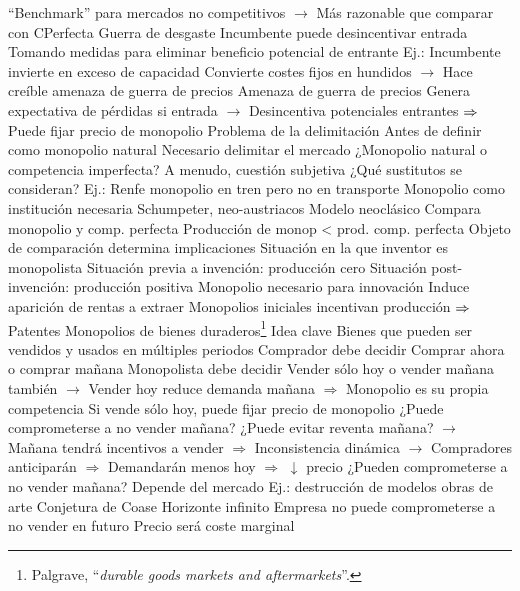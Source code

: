 \documentclass{nuevotema}
\begin{document}
\begin{esquemal}
				\4[] ``Benchmark'' para mercados no competitivos
				\4[] $\to$ Más razonable que comparar con CPerfecta
			\3 Guerra de desgaste
				\4 Incumbente puede desincentivar entrada
				\4[] Tomando medidas para eliminar beneficio potencial de entrante
				\4 Ej.:
				\4[] Incumbente invierte en exceso de capacidad
				\4[] Convierte costes fijos en hundidos
				\4[] $\to$ Hace creíble amenaza de guerra de precios
				\4 Amenaza de guerra de precios
				\4[] Genera expectativa de pérdidas si entrada
				\4[] $\to$ Desincentiva potenciales entrantes
				\4[] $\then$ Puede fijar precio de monopolio
			\3 Problema de la delimitación
				\4 Antes de definir como monopolio natural
				\4[] Necesario delimitar el mercado
				\4 ¿Monopolio natural o competencia imperfecta?
				\4[] A menudo, cuestión subjetiva
				\4[] ¿Qué sustitutos se consideran?
				\4[] Ej.: Renfe monopolio en tren pero no en transporte
			\3 Monopolio como institución necesaria
				\4 Schumpeter, neo-austriacos
				\4 Modelo neoclásico
				\4[] Compara monopolio y comp. perfecta
				\4[] Producción de monop < prod. comp. perfecta
				\4 Objeto de comparación determina implicaciones
				\4[] Situación en la que inventor es monopolista
				\4[] Situación previa a invención: producción cero
				\4[] Situación post-invención: producción positiva
				\4[$\then$] Monopolio necesario para innovación
				\4[] Induce aparición de rentas a extraer
				\4[$\then$] Monopolios iniciales incentivan producción
				\4[] $\then$ Patentes
		\2 Monopolios de bienes duraderos\footnote{Palgrave, ``\textit{durable goods markets and aftermarkets}''.}
			\3 Idea clave
				\4 Bienes que pueden ser vendidos y usados en múltiples periodos
				\4 Comprador debe decidir
				\4[] Comprar ahora o comprar mañana
				\4 Monopolista debe decidir
				\4[] Vender sólo hoy o vender mañana también
				\4[] $\to$ Vender hoy reduce demanda mañana
				\4[] $\Rightarrow$ Monopolio es su propia competencia
				\4[] Si vende sólo hoy, puede fijar precio de monopolio
				\4[] ¿Puede comprometerse a no vender mañana?
				\4[] ¿Puede evitar reventa mañana?
				\4[] $\to$ Mañana tendrá incentivos a vender
				\4[] $\Rightarrow$ Inconsistencia dinámica
				\4[] $\to$ Compradores anticiparán
				\4[] $\Rightarrow$ Demandarán menos hoy $\Rightarrow$ $\downarrow$ precio
				\4 ¿Pueden comprometerse a no vender mañana?
				\4[] Depende del mercado
				\4[] Ej.: destrucción de modelos obras de arte
			\3 Conjetura de Coase
				\4 Horizonte infinito
				\4 Empresa no puede comprometerse a no vender en futuro
				\4[$\Rightarrow$] Precio será coste marginal

\end{esquemal}
\end{document}
